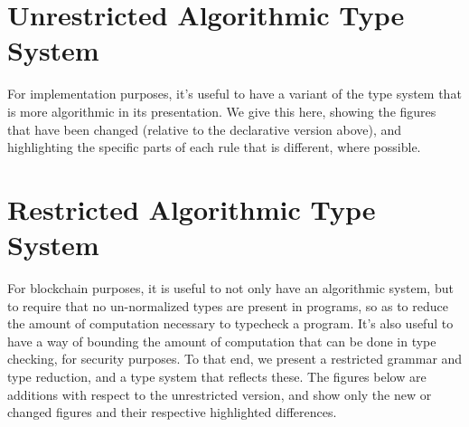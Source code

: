 \documentclass[a4paper]{article}
\begin{document}
\section{Unrestricted Algorithmic Type System}

For implementation purposes, it's useful to have a variant of the type system that is more algorithmic in its presentation. We give this here, showing the figures that have been changed (relative to the declarative version above), and highlighting the specific parts of each rule that is different, where possible.





\section{Restricted Algorithmic Type System}

For blockchain purposes, it is useful to not only have an algorithmic system, but to require that no un-normalized types are present in programs, so as to reduce the amount of computation necessary to typecheck a program. It's also useful to have a way of bounding the amount of computation that can be done in type checking, for security purposes. To that end, we present a restricted grammar and type reduction, and a type system that reflects these. The figures below are additions with respect to the unrestricted version, and show only the new or changed figures and their respective highlighted differences.








\end{document}
